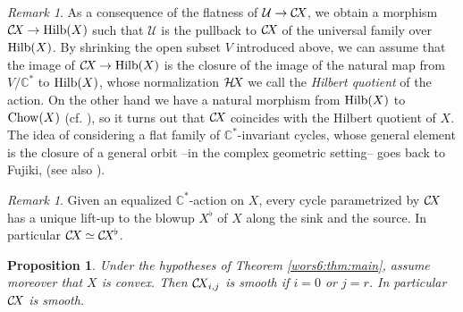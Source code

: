 \documentclass[10pt,a4paper]{article}
\numberwithin{equation}{section}
\newtheorem{proposition}[theorem]{Proposition}
\theoremstyle{definition}
\theoremstyle{remark}
\newtheorem{remark}[theorem]{Remark}
\def\C{{\mathbb C}}
\def\cU{{\mathcal U}}
\def\operatorname#1{\mathop{\rm #1}\nolimits}
\def\Chow{\operatorname{Chow}}
\def\Hilb{\operatorname{Hilb}}
\def\CX{\mathcal{C}\!X\hspace{-0.5pt}}
\def\HX{\mathcal{H}\!X\hspace{-0.5pt}}
\begin{document}
\begin{remark}\label{wors6:rem:Hilb}
As a consequence of the flatness of $\cU\to \CX$, we obtain a morphism $\CX\to \Hilb(X)$ such that $\cU$ is the pullback to $\CX$ of the universal family over $\Hilb(X)$. By shrinking the open subset $V$ introduced above, we can assume that the image of $\CX\to \Hilb(X)$ is the closure of the image of the natural map from $V/\C^*$ to $\Hilb(X)$, whose normalization $\HX$ we call the {\em Hilbert quotient} of the action. On the other hand we have a natural morphism from $\Hilb(X)$ to $\Chow(X)$ (cf. \cite[Theorem I.6.3]{wors6-kollar}), so it turns out that $\CX$ coincides with the Hilbert quotient of $X$. The idea of considering a flat family of $\C^*$-invariant cycles, whose general element is the closure of a general orbit --in the complex geometric setting-- goes back to Fujiki, \cite{wors6-Fj} (see also \cite[Theorem~0.1.2]{wors6-BBSo}).
\end{remark}

\begin{remark}\label{wors6:rem:chblow}
Given an equalized $\C^*$-action on $X$, every cycle parametrized by $\CX$ has a unique lift-up to the blowup $X^\flat$  of $X$ along the sink and the source. In particular  $\CX \simeq \CX^\flat$.
\end{remark}

\setcounter{section}{6}\setcounter{theorem}{3}\setcounter{equation}{13}

\begin{proposition}\label{wors6:prop:smoothChows} Under the hypotheses of Theorem \ref{wors6:thm:main}, assume moreover that $X$ is convex. Then $\CX_{i,j}$ is smooth if $i=0$ or $j=r$. %
In particular $\CX$ is smooth.
\end{proposition}
\end{document}
